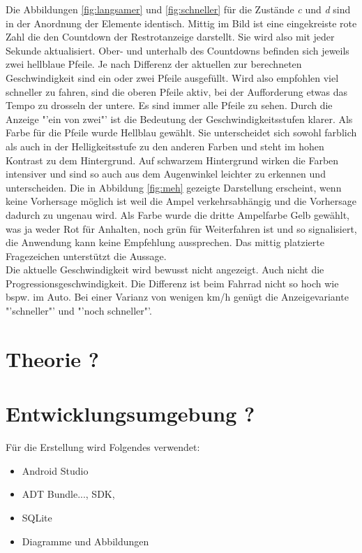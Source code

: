 Die Abbildungen \ref{fig:langsamer} und \ref{fig:schneller} für die Zustände \textit{c} und \textit{d} sind in der Anordnung der Elemente identisch. Mittig im Bild ist eine eingekreiste rote Zahl die den Countdown der Restrotanzeige darstellt. Sie wird also mit jeder Sekunde aktualisiert. Ober- und unterhalb des Countdowns befinden sich jeweils zwei hellblaue Pfeile. Je nach Differenz der aktuellen zur berechneten Geschwindigkeit sind ein oder zwei Pfeile ausgefüllt. Wird also empfohlen viel schneller zu fahren, sind die oberen Pfeile aktiv, bei der Aufforderung etwas das Tempo zu drosseln der untere. Es sind immer alle Pfeile zu sehen. Durch die Anzeige "'ein von zwei"' ist die Bedeutung der Geschwindigkeitsstufen klarer. Als Farbe für die Pfeile wurde Hellblau gewählt. Sie unterscheidet sich sowohl farblich als auch in der Helligkeitsstufe zu den anderen Farben und steht im hohen Kontrast zu dem Hintergrund. Auf schwarzem Hintergrund wirken die Farben intensiver und sind so auch aus dem Augenwinkel leichter zu erkennen und unterscheiden. Die in Abbildung \ref{fig:meh} gezeigte Darstellung erscheint, wenn keine Vorhersage möglich ist weil die Ampel verkehrsabhängig und die Vorhersage dadurch zu ungenau wird. Als Farbe wurde die dritte Ampelfarbe Gelb gewählt, was ja weder Rot für Anhalten, noch grün für Weiterfahren ist und so signalisiert, die Anwendung kann keine Empfehlung aussprechen. Das mittig platzierte Fragezeichen unterstützt die Aussage.\\
Die aktuelle Geschwindigkeit wird bewusst nicht angezeigt. Auch nicht die Progressionsgeschwindigkeit. Die Differenz ist beim Fahrrad nicht so hoch wie bspw. im Auto. Bei einer Varianz von wenigen km/h genügt die Anzeigevariante "'schneller"' und "'noch schneller"'.
\section{Theorie ?}
\section{Entwicklungsumgebung ?}
Für die Erstellung wird Folgendes verwendet:
\begin{itemize}
	\item Android Studio
	\item ADT Bundle..., SDK, 
	\item SQLite
	\item Diagramme und Abbildungen
\end{itemize}
